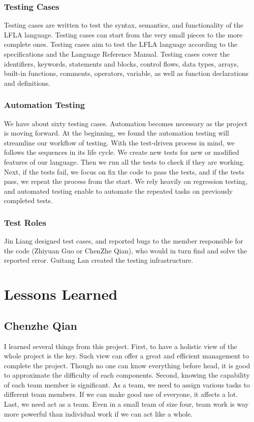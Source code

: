 \documentclass[12pt]{article} %
\begin{document}
\subsubsection{Testing Cases}
\noindent Testing cases are written to test the syntax, semantics, and functionality of the LFLA language. Testing cases can start from the very small pieces to the more complete ones. Testing cases aim to test the LFLA language according to the specifications and the Language Reference Manual. Testing cases cover the identifiers, keywords, statements and blocks, control flows, data types, arrays, built-in functions, comments, operators, variable, as well as function declarations and definitions.

\subsubsection{Automation Testing}
\noindent We have about sixty testing cases. Automation becomes necessary as the project is moving forward. At the beginning, we found the automation testing will streamline our workflow of testing. With the test-driven process in mind, we follows the sequences in its life cycle. We create new tests for new or modified features of our language. Then we run all the tests to check if they are working. Next, if the tests fail, we focus on fix the code to pass the tests, and if the tests pass, we repeat the process from the start. We rely heavily on regression testing, and automated testing enable to automate the repeated tasks on previously completed tests.

\subsubsection{Test Roles}
\noindent Jin Liang designed test cases, and reported bugs to the member responsible for the code (Zhiyuan Guo or ChenZhe Qian), who would in turn find and solve the reported error. Guitang Lan created the testing infrastructure.


\section{Lessons Learned}

\subsection{Chenzhe Qian}
\noindent I learned several things from this project. First, to have a holistic view of the whole project is the key. Such view can offer a great and efficient management to complete the project. Though no one can know everything before head, it is good to approximate the difficulty of each components. Second, knowing the capability of each team member is significant. As a team, we need to assign various tasks to different team members. If we can make good use of everyone, it affects a lot. Last, we need act as a team. Even in a small team of size four, team work is way more powerful than individual work if we can act like a whole.
\end{document}
